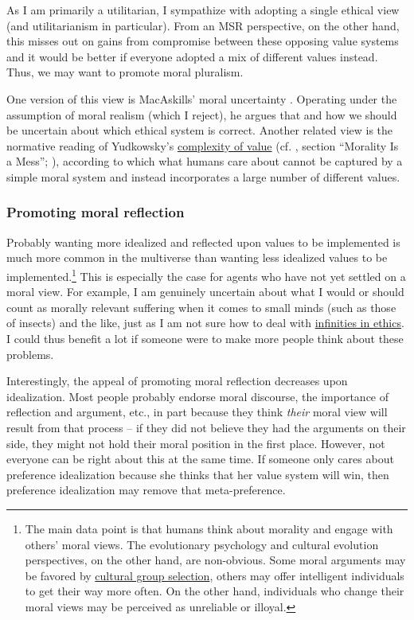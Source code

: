 As I am primarily a utilitarian, I sympathize with adopting a single
ethical view (and utilitarianism in particular). From an MSR
perspective, on the other hand, this misses out on gains from compromise
between these opposing value systems and it would be better if everyone
adopted a mix of different values instead. Thus, we may want to promote
moral pluralism.

One version of this view is MacAskills' 
moral uncertainty \citeyear{MacAskill2014-ca}. Operating under the assumption of moral realism
(which I reject), he argues that and how we should be uncertain about
which ethical system is correct. Another related view is the normative
reading of Yudkowsky's
\href{https://wiki.lesswrong.com/wiki/Complexity_of_value}{complexity
of value} (cf. \citet{Stewart-Williams2015-gg}, section
``Morality Is a Mess''; \cite[chapters 3--5.3]{Muehlhauser2012-ib}),
according to which what humans care about cannot be captured by a simple
moral system and instead incorporates a large number of different
values.

\subsubsection{Promoting moral
reflection}\label{promoting-moral-reflection}

Probably wanting more idealized and reflected upon values to be
implemented is much more common in the multiverse than wanting less
idealized values to be implemented.\footnote{The main data point is that
  humans think about morality and engage with others' moral views. The
  evolutionary psychology and cultural evolution perspectives, on the
  other hand, are non-obvious. Some moral arguments may be favored by
  \href{https://en.wikipedia.org/wiki/Cultural_group_selection}{cultural
  group selection}, others may offer intelligent individuals to get
  their way more often. On the other hand, individuals who change their
  moral views may be perceived as unreliable or illoyal.} This is
especially the case for agents who have not yet settled on a moral view.
For example, I am genuinely uncertain about what I would or should count
as morally relevant suffering when it comes to small minds (such as
those of insects) and the like, just as I am not sure how to deal with
\href{https://foundational-research.org/infinity-in-ethics/}{infinities
in ethics}. I could thus benefit a lot if someone were to make more
people think about these problems.

Interestingly, the appeal of promoting moral reflection decreases upon
idealization. Most people probably endorse moral discourse, the
importance of reflection and argument, etc., in part because they think
\emph{their} moral view will result from that process -- if they did not
believe they had the arguments on their side, they might not hold their
moral position in the first place. However, not everyone can be right
about this at the same time. If someone only cares about preference
idealization because she thinks that her value system will win, then
preference idealization may remove that meta-preference.

